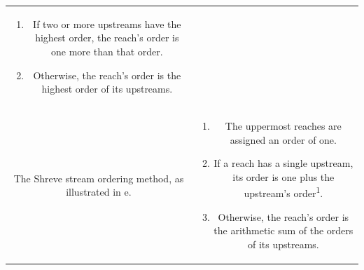 \documentclass[water,article,submit,pdftex,moreauthors]{Definitions/mdpi}
\begin{document}
\begin{table}[H]
\begin{tabularx}{\textwidth}{c C}
\begin{enumerate}
                                                         \item If two or more upstreams have the highest order, the reach's order is one more than that order.
                                                         \item Otherwise, the reach's order is the highest order of its upstreams.
                                                     \end{enumerate}
        \\
        The Shreve stream ordering method,
        as illustrated in e. & \begin{enumerate}
                                                         \item The uppermost reaches are assigned an order of one.
                                                         \item If a reach has a single upstream, its order is one plus the upstream's order\textsuperscript{1}.
                                                         \item Otherwise, the reach's order is the arithmetic sum of the orders of its upstreams.
                                                     \end{enumerate}
        \\
        \bottomrule
    \end{tabularx}

\end{table}
\end{document}
